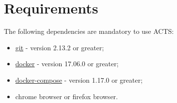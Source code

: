 \section{Requirements}\label{req}

The following dependencies are mandatory to use ACTS:
\begin{itemize}
   \item \href{https://git-scm.com/}{git} - version 2.13.2 or greater;
   \item \href{https://www.docker.com/get-docker}{docker} - version 17.06.0 or greater;
   \item \href{https://docs.docker.com/compose/install/}{docker-compose} - version 1.17.0 or greater;
   \item chrome browser or firefox browser.
\end{itemize}